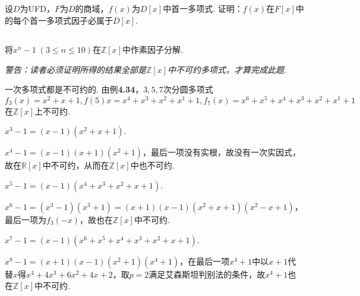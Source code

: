 
\subsection{}
设$D$为UFD，$F$为$D$的商域，$f(x)$为$D[x]$中首一多项式. 证明：$f(x)$在$F[x]$中的每个首一多项式因子必属于$D[x]$.


\subsection{}
将$x^n-1\;(3\leq n\leq 10)$在$\mathbb{Z}[x]$中作素因子分解.

\emph{警告：读者必须证明所得的结果全部是$\mathbb{Z}[x]$中不可约多项式，才算完成此题.}

\jie 一次多项式都是不可约的. 由{\heiti 例}\textbf{4.34}，$3,5,7$次分圆多项式$f_3(x)=x^2+x+1, f(5)x=x^4+x^3+x^2+x^1+1, f_7(x)=x^6+x^5+x^4+x^3+x^2+x^1+1$在$\mathbb{Z}[x]$上不可约.

$x^3-1=(x-1)(x^2+x+1)$.

$x^4-1=(x-1)(x+1)(x^2+1)$，最后一项没有实根，故没有一次实因式，故在$\mathbb{R}[x]$中不可约，从而在$\mathbb{Z}[x]$中也不可约.

$x^5-1=(x-1)(x^4+x^3+x^2+x+1)$.

$x^6-1=(x^3-1)(x^3+1)=(x+1)(x-1)(x^2+x+1)(x^2-x+1)$，最后一项为$f_3(-x)$，故也在$\mathbb{Z}[x]$中不可约.

$x^7-1=(x-1)(x^6+x^5+x^4+x^3+x^2+x+1)$.

$x^8-1=(x+1)(x-1)(x^2+1)(x^4+1)$，在最后一项$x^4+1$中以$x+1$代替$x$得$x^4+4x^3+6x^2+4x+2$，取$p=2$满足艾森斯坦判别法的条件，故$x^4+1$也在$\mathbb{Z}[x]$中不可约.

